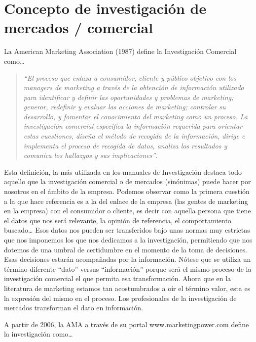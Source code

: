 \documentclass[
]{book}
\begin{document}
\hypertarget{concepto-de-investigaciuxf3n-de-mercados-comercial}{%
\section{Concepto de investigación de mercados / comercial}\label{concepto-de-investigaciuxf3n-de-mercados-comercial}}

La American Marketing Association (1987) define la Investigación Comercial como\ldots{}

\begin{quote}
\emph{``El proceso que enlaza a consumidor, cliente y público objetivo con los managers de marketing a través de la obtención de información utilizada para identificar y definir las oportunidades y problemas de marketing; generar, redefinir y evaluar las acciones de marketing; controlar su desarrollo, y fomentar el conocimiento del marketing como un proceso. La investigación comercial especifica la información requerida para orientar estas cuestiones, diseña el método de recogida de la información, dirige e implementa el proceso de recogida de datos, analiza los resultados y comunica los hallazgos y sus implicaciones''}.
\end{quote}

Esta definición, la más utilizada en los manuales de Investigación destaca todo aquello que la investigación comercial o de mercados (sinónimas) puede hacer por nosotros en el ámbito de la empresa. Podemos observar como la primera cuestión a la que hace referencia es a la del enlace de la empresa (las gentes de marketing en la empresa) con el consumidor o cliente, es decir con aquella persona que tiene el datos que nos será relevante, la opinión de referencia, el comportamiento buscado\ldots{} Esos datos nos pueden ser transferidos bajo unas normas muy estrictas que nos imponemos los que nos dedicamos a la investigación, permitiendo que nos dotemos de una umbral de certidumbre en el momento de la toma de decisiones. Esas decisiones estarán acompañadas por la información. Nótese que se utiliza un término diferente ``dato'' versus ``información'' porque será el mismo proceso de la investigación comercial el que permita esa transformación. Ahora que en la literatura de marketing estamos tan acostumbrados a oír el término valor, esta es la expresión del mismo en el proceso. Los profesionales de la investigación de mercados transforman el dato en información.

A partir de 2006, la AMA a través de su portal www.marketingpower.com define la investigación como\ldots{}
\end{document}
